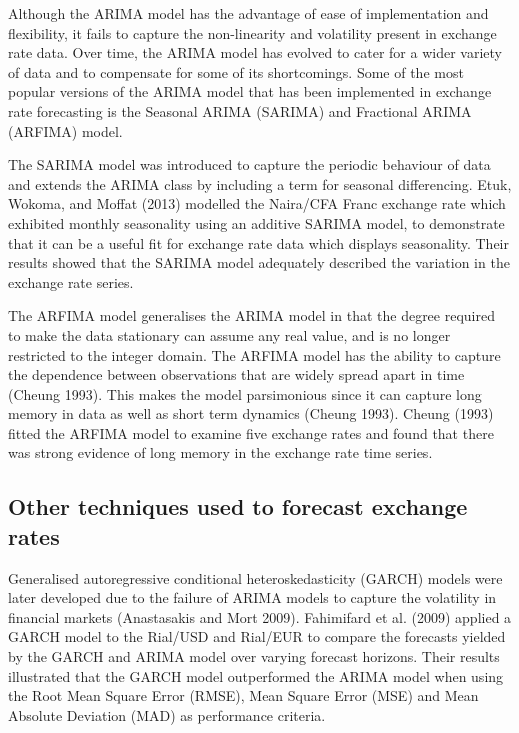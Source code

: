 \documentclass[12pt,a4paper]{article}
\numberwithin{equation}{section}
\numberwithin{figure}{section}
\numberwithin{table}{section}
\begin{document}
Although the ARIMA model has the advantage of ease of implementation and
flexibility, it fails to capture the non-linearity and volatility
present in exchange rate data. Over time, the ARIMA model has evolved to
cater for a wider variety of data and to compensate for some of its
shortcomings. Some of the most popular versions of the ARIMA model that
has been implemented in exchange rate forecasting is the Seasonal ARIMA
(SARIMA) and Fractional ARIMA (ARFIMA) model.

The SARIMA model was introduced to capture the periodic behaviour of
data and extends the ARIMA class by including a term for seasonal
differencing. Etuk, Wokoma, and Moffat (2013) modelled the Naira/CFA
Franc exchange rate which exhibited monthly seasonality using an
additive SARIMA model, to demonstrate that it can be a useful fit for
exchange rate data which displays seasonality. Their results showed that
the SARIMA model adequately described the variation in the exchange rate
series.

The ARFIMA model generalises the ARIMA model in that the degree required
to make the data stationary can assume any real value, and is no longer
restricted to the integer domain. The ARFIMA model has the ability to
capture the dependence between observations that are widely spread apart
in time (Cheung 1993). This makes the model parsimonious since it can
capture long memory in data as well as short term dynamics (Cheung
1993). Cheung (1993) fitted the ARFIMA model to examine five exchange
rates and found that there was strong evidence of long memory in the
exchange rate time series.

\subsection{Other techniques used to forecast exchange
rates}\label{other-techniques-used-to-forecast-exchange-rates}

Generalised autoregressive conditional heteroskedasticity (GARCH) models
were later developed due to the failure of ARIMA models to capture the
volatility in financial markets (Anastasakis and Mort 2009). Fahimifard
et al. (2009) applied a GARCH model to the Rial/USD and Rial/EUR to
compare the forecasts yielded by the GARCH and ARIMA model over varying
forecast horizons. Their results illustrated that the GARCH model
outperformed the ARIMA model when using the Root Mean Square Error
(RMSE), Mean Square Error (MSE) and Mean Absolute Deviation (MAD) as
performance criteria.
\end{document}

